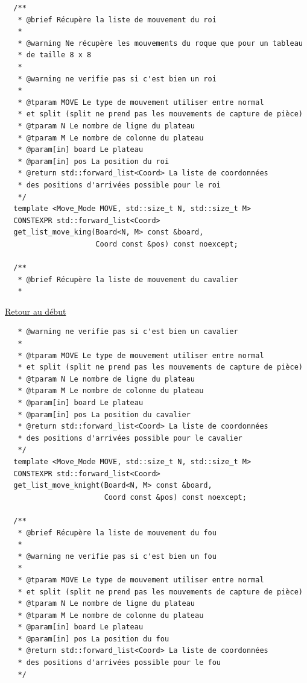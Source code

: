 {\begin{frame}[fragile]
\begin{verbatim}
  /**
   * @brief Récupère la liste de mouvement du roi
   *
   * @warning Ne récupère les mouvements du roque que pour un tableau
   * de taille 8 x 8
   *
   * @warning ne verifie pas si c'est bien un roi
   *
   * @tparam MOVE Le type de mouvement utiliser entre normal
   * et split (split ne prend pas les mouvements de capture de pièce)
   * @tparam N Le nombre de ligne du plateau
   * @tparam M Le nombre de colonne du plateau
   * @param[in] board Le plateau
   * @param[in] pos La position du roi
   * @return std::forward_list<Coord> La liste de coordonnées
   * des positions d'arrivées possible pour le roi
   */
  template <Move_Mode MOVE, std::size_t N, std::size_t M>
  CONSTEXPR std::forward_list<Coord>
  get_list_move_king(Board<N, M> const &board,
                     Coord const &pos) const noexcept;

  /**
   * @brief Récupère la liste de mouvement du cavalier
   *
\end{verbatim}
\end{frame}

\begin{frame}[fragile]
\hyperlink{conclusion}{Retour au début}\newline
\begin{verbatim}
   * @warning ne verifie pas si c'est bien un cavalier
   *
   * @tparam MOVE Le type de mouvement utiliser entre normal
   * et split (split ne prend pas les mouvements de capture de pièce)
   * @tparam N Le nombre de ligne du plateau
   * @tparam M Le nombre de colonne du plateau
   * @param[in] board Le plateau
   * @param[in] pos La position du cavalier
   * @return std::forward_list<Coord> La liste de coordonnées
   * des positions d'arrivées possible pour le cavalier
   */
  template <Move_Mode MOVE, std::size_t N, std::size_t M>
  CONSTEXPR std::forward_list<Coord>
  get_list_move_knight(Board<N, M> const &board,
                       Coord const &pos) const noexcept;

  /**
   * @brief Récupère la liste de mouvement du fou
   *
   * @warning ne verifie pas si c'est bien un fou
   *
   * @tparam MOVE Le type de mouvement utiliser entre normal
   * et split (split ne prend pas les mouvements de capture de pièce)
   * @tparam N Le nombre de ligne du plateau
   * @tparam M Le nombre de colonne du plateau
   * @param[in] board Le plateau
   * @param[in] pos La position du fou
   * @return std::forward_list<Coord> La liste de coordonnées
   * des positions d'arrivées possible pour le fou
   */
\end{verbatim}
\end{frame}

}
